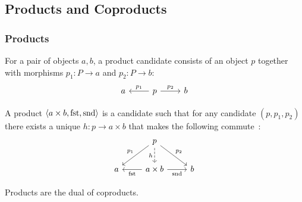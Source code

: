 \subsection{Products and Coproducts}

\subsubsection*{Products}

\begin{definition}

	For a pair of objects $a, b$, a product candidate consists of an object $p$
	together with morphisms $p_1: P\to a$ and $p_2:P\to b$:
	\[\begin{tikzcd}[ampersand replacement=\&]
		a \& p \& b
		\arrow["{p_1}"', from=1-2, to=1-1]
		\arrow["{p_2}", from=1-2, to=1-3]
	\end{tikzcd}\]

	A product $\langle a\times b, \mathrm{fst}, \mathrm{snd}\rangle$ is a candidate such that
	for any candidate $(p, p_1, p_2)$ there exists a unique $h: p\to a\times b$
	that makes the following
	commute~\parencite[p.~108]{leinster:basic_category_theory}:
	\[\begin{tikzcd}[ampersand replacement=\&]
		\& p \\
		a \& {a\times b} \& b
		\arrow["{\mathrm{fst}}", from=2-2, to=2-1]
		\arrow["{\mathrm{snd}}"', from=2-2, to=2-3]
		\arrow["{p_1}"', from=1-2, to=2-1]
		\arrow["{p_2}", from=1-2, to=2-3]
		\arrow["h"', dashed, from=1-2, to=2-2]
	\end{tikzcd}\]
\end{definition}

\begin{remark}
	Products are the dual of coproducts.
\end{remark}


